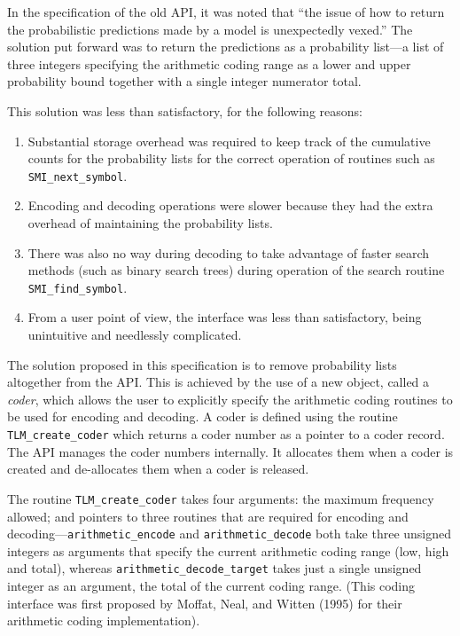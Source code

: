 \documentclass[11pt]{article}
\begin{document}
In the specification of the old API, it was noted that ``the  
issue of how to return the probabilistic predictions made by a model is
unexpectedly vexed.'' The solution put forward was to return the predictions
as a probability list---a list of three integers specifying the arithmetic
coding range as a lower and upper probability bound together
with a single integer numerator total.

This solution was less than satisfactory, for the following reasons:

\begin{enumerate}
\item Substantial storage overhead was required to keep track of the
      cumulative counts for the probability lists for the correct operation
      of routines such as \verb|SMI_next_symbol|.
\item Encoding and decoding operations were slower because
      they had the extra overhead of maintaining the probability lists.
\item There was also no way during decoding to take advantage of faster
      search methods (such as binary search trees) during operation of the
      search routine \verb|SMI_find_symbol|.
\item From a user point of view, the interface was less than satisfactory, being
      unintuitive and needlessly complicated.
\end{enumerate}

The solution proposed in this specification is to remove probability lists
altogether from the API. This is achieved by the use of a new object, called a {\em coder},
which allows the user to explicitly specify the arithmetic coding
routines to be used for encoding and decoding. 
A coder is defined using the routine \verb|TLM_create_coder| which returns
a coder number as a pointer to a coder record. The API manages the coder
numbers internally. It allocates them when a coder is created
and de-allocates them when a coder is released.

The routine \verb|TLM_create_coder| takes four arguments: the
maximum frequency allowed; and pointers to three routines that are required for encoding
and decoding---\verb|arithmetic_encode| and \verb|arithmetic_decode| both take three unsigned integers
as arguments that specify the current arithmetic coding range (low, high
and total), whereas \verb|arithmetic_decode_target| takes just a single unsigned integer
as an argument, the total of the current coding range.
(This coding interface was first proposed by Moffat, Neal, and Witten (1995) for their
arithmetic coding implementation).
\end{document}
